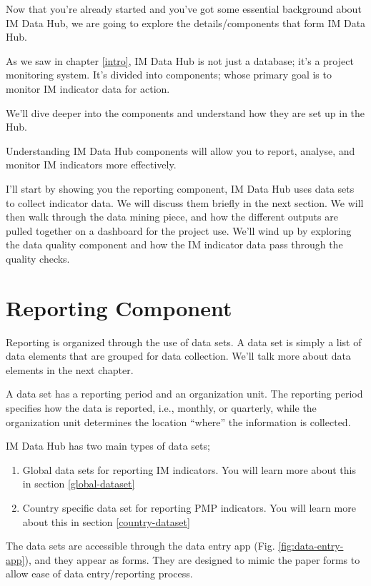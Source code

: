 \documentclass[]{book}
\providecommand{\tightlist}{%
  \setlength{\itemsep}{0pt}\setlength{\parskip}{0pt}}
\begin{document}
Now that you're already started and you've got some essential background about IM Data Hub, we are going to explore the details/components that form IM Data Hub.

As we saw in chapter \ref{intro}, IM Data Hub is not just a database; it's a project monitoring system. It's divided into components; whose primary goal is to monitor IM indicator data for action.

We'll dive deeper into the components and understand how they are set up in the Hub.

Understanding IM Data Hub components will allow you to report, analyse, and monitor IM indicators more effectively.

I'll start by showing you the reporting component, IM Data Hub uses data sets to collect indicator data. We will discuss them briefly in the next section. We will then walk through the data mining piece, and how the different outputs are pulled together on a dashboard for the project use. We'll wind up by exploring the data quality component and how the IM indicator data pass through the quality checks.

\hypertarget{reporting-component}{%
\section{Reporting Component}\label{reporting-component}}

Reporting is organized through the use of data sets. A data set is simply a list of data elements that are grouped for data collection. We'll talk more about data elements in the next chapter.

A data set has a reporting period and an organization unit. The reporting period specifies how the data is reported, i.e., monthly, or quarterly, while the organization unit determines the location ``where'' the information is collected.

IM Data Hub has two main types of data sets;

\begin{enumerate}
\def\labelenumi{\arabic{enumi}.}
\tightlist
\item
  Global data sets for reporting IM indicators. You will learn more about this in section \ref{global-dataset}
\item
  Country specific data set for reporting PMP indicators. You will learn more about this in section \ref{country-dataset}
\end{enumerate}

The data sets are accessible through the data entry app (Fig. \ref{fig:data-entry-app}), and they appear as forms. They are designed to mimic the paper forms to allow ease of data entry/reporting process.
\end{document}
